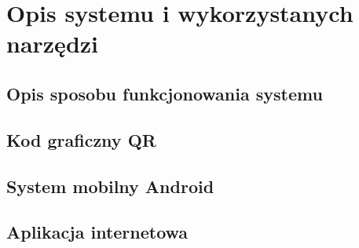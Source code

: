 \section{Opis systemu i wykorzystanych narzędzi}
\subsection{Opis sposobu funkcjonowania systemu}
\subsection{Kod graficzny QR}
\subsection{System mobilny Android}
\subsection{Aplikacja internetowa}
